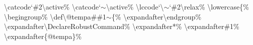 \begin{linenumbers}
\hspace*{1.2em}\textbackslash catcode`\#2\textbackslash active\%\newline
\hspace*{1.2em}\textbackslash catcode`$\sim$\textbackslash active\%\newline
\hspace*{1.2em}\textbackslash lccode`\textbackslash $\sim$`\#2\textbackslash relax\%\newline
\hspace*{1.2em}\textbackslash lowercase\{\%\newline
\hspace*{2.4em}\textbackslash begingroup\%\newline
\hspace*{2.4em}\textbackslash def\textbackslash @tempa\#\#1$\sim$\{\%\newline
\hspace*{3.6em}\textbackslash expandafter\textbackslash endgroup\%\newline
\hspace*{3.6em}\textbackslash expandafter\textbackslash DeclareRobustCommand\%\newline
\hspace*{3.6em}\textbackslash expandafter*\%\newline
\hspace*{3.6em}\textbackslash expandafter\#1\%\newline
\hspace*{3.6em}\textbackslash expandafter\{@tempa\}\%\newline

\end{linenumbers}
